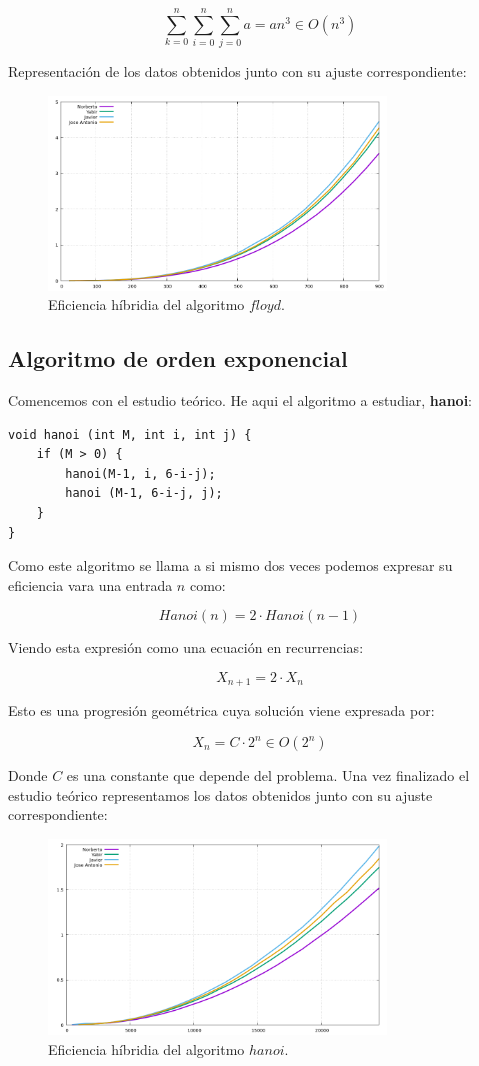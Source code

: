 \documentclass[11pt,a4paper]{article}
\begin{document}
$$\sum_{k=0}^{n} \sum_{i=0}^{n} \sum_{j=0}^{n} a = a n^3 \in O(n^3)$$

Representación de los datos obtenidos junto con su ajuste correspondiente:

\begin{figure}[H]
	\centering
	\includegraphics[width=0.8\textwidth]{../plots/floyd}
	\caption{Eficiencia híbridia del algoritmo $floyd$.}
\end{figure}

\subsection{Algoritmo de orden exponencial}

Comencemos con el estudio teórico. He aqui el algoritmo a estudiar, \textbf{hanoi}:

\begin{lstlisting}
void hanoi (int M, int i, int j) {
	if (M > 0) {
		hanoi(M-1, i, 6-i-j);
		hanoi (M-1, 6-i-j, j);
	}
}	     	
\end{lstlisting}

Como este algoritmo se llama a si mismo dos veces podemos expresar su eficiencia vara una entrada $n$ como:

$$Hanoi(n) = 2 \cdot Hanoi(n-1)$$

Viendo esta expresión como una ecuación en recurrencias:

$$X_{n+1} = 2 \cdot X_n$$

Esto es una progresión geométrica cuya solución viene expresada por:

$$X_n = C \cdot 2^n \in O(2^n)$$

Donde $C$ es una constante que depende del problema. Una vez finalizado el estudio teórico representamos los datos obtenidos junto con su ajuste correspondiente:

\begin{figure}[H]
	\centering
	\includegraphics[width=0.8\textwidth]{../plots/burbuja}
	\caption{Eficiencia híbridia del algoritmo $hanoi$.}
\end{figure}
\end{document}
